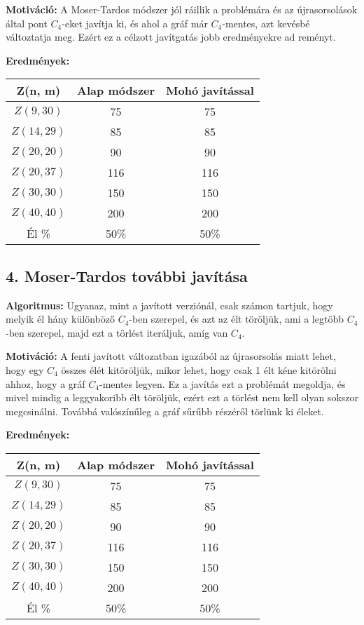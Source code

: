 \documentclass[12pt,a4paper]{article}
\begin{document}
\textbf{Motiváció:} A Moser-Tardos módszer jól ráillik a problémára és az újrasorsolások által pont $C_4$-eket javítja ki, és ahol a gráf már $C_4$-mentes, azt kevésbé változtatja meg. Ezért ez a célzott javítgatás jobb eredményekre ad reményt.

\textbf{Eredmények:}
\begin{table}[H]
\centering
\begin{tabular}{|c|c|c|}
\hline
\textbf{Z(n, m)} & \textbf{Alap módszer} & \textbf{Mohó javítással} \\
\hline
$Z(9,30)$  & 75 & 75 \\
$Z(14, 29)$ & 85 & 85 \\
$Z(20, 20)$ & 90 & 90 \\
$Z(20, 37)$ & 116 & 116 \\
$Z(30, 30)$ & 150 & 150 \\
$Z(40, 40)$ & 200 & 200 \\
\hline
Él \% & 50\% & 50\% \\
\hline
\end{tabular}
\end{table}
\subsection*{4. Moser-Tardos további javítása}

\textbf{Algoritmus:} Ugyanaz, mint a javított verziónál, csak számon tartjuk, hogy melyik él hány különböző $C_4$-ben szerepel, és azt az élt töröljük, ami a legtöbb $C_4$-ben szerepel, majd ezt a törlést iteráljuk, amíg van $C_4$.

\textbf{Motiváció:} A fenti javított változatban igazából az újrasorsolás miatt lehet, hogy egy $C_4$ összes élét kitöröljük, mikor lehet, hogy csak 1 élt kéne kitörölni ahhoz, hogy a gráf $C_4$-mentes legyen. Ez a javítás ezt a problémát megoldja, és mivel mindig a leggyakoribb élt töröljük, ezért ezt a törlést nem kell olyan sokszor megcsinálni. Továbbá valószínűleg a gráf sűrűbb részéről törlünk ki éleket.

\textbf{Eredmények:}
\begin{table}[H]
\centering
\begin{tabular}{|c|c|c|}
\hline
\textbf{Z(n, m)} & \textbf{Alap módszer} & \textbf{Mohó javítással} \\
\hline
$Z(9,30)$  & 75 & 75 \\
$Z(14, 29)$ & 85 & 85 \\
$Z(20, 20)$ & 90 & 90 \\
$Z(20, 37)$ & 116 & 116 \\
$Z(30, 30)$ & 150 & 150 \\
$Z(40, 40)$ & 200 & 200 \\
\hline
Él \% & 50\% & 50\% \\
\hline
\end{tabular}
\end{table}
\end{document}
